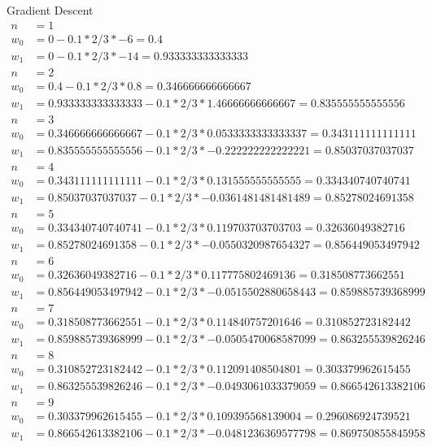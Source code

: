 \documentclass{report}
\begin{document}
Gradient Descent
\begin{equation} \label{eq1}
\begin{split}
n & = 1\\
w_0 & = 0 - 0.1 * 2/3 * -6 = 0.4\\
w_1 & = 0 - 0.1 * 2/3 * -14 = 0.933333333333333\\
n & = 2\\
w_0 & = 0.4 - 0.1 * 2/3 * 0.8 = 0.346666666666667\\
w_1 & = 0.933333333333333 - 0.1 * 2/3 * 1.46666666666667 = 0.835555555555556\\
n & = 3\\
w_0 & = 0.346666666666667 - 0.1 * 2/3 * 0.0533333333333337 = 0.343111111111111\\
w_1 & = 0.835555555555556 - 0.1 * 2/3 * -0.222222222222221 = 0.85037037037037\\
n & = 4\\
w_0 & = 0.343111111111111 - 0.1 * 2/3 * 0.131555555555555 = 0.334340740740741\\
w_1 & = 0.85037037037037 - 0.1 * 2/3 * -0.0361481481481489 = 0.85278024691358\\
n & = 5\\
w_0 & = 0.334340740740741 - 0.1 * 2/3 * 0.119703703703703 = 0.32636049382716\\
w_1 & = 0.85278024691358 - 0.1 * 2/3 * -0.0550320987654327 = 0.856449053497942\\
n & = 6\\
w_0 & = 0.32636049382716 - 0.1 * 2/3 * 0.117775802469136 = 0.318508773662551\\
w_1 & = 0.856449053497942 - 0.1 * 2/3 * -0.0515502880658443 = 0.859885739368999\\
n & = 7\\
w_0 & = 0.318508773662551 - 0.1 * 2/3 * 0.114840757201646 = 0.310852723182442\\
w_1 & = 0.859885739368999 - 0.1 * 2/3 * -0.0505470068587099 = 0.863255539826246\\
n & = 8\\
w_0 & = 0.310852723182442 - 0.1 * 2/3 * 0.112091408504801 = 0.303379962615455\\
w_1 & = 0.863255539826246 - 0.1 * 2/3 * -0.0493061033379059 = 0.866542613382106\\
n & = 9\\
w_0 & = 0.303379962615455 - 0.1 * 2/3 * 0.109395568139004 = 0.296086924739521\\
w_1 & = 0.866542613382106 - 0.1 * 2/3 * -0.0481236369577798 = 0.869750855845958\\
\end{split}
\end{equation}
\end{document}

